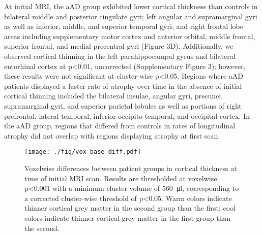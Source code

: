 \documentclass[]{article}
\begin{document}
At initial MRI, the aAD group exhibited lower cortical thickness than
controls in bilateral middle and posterior cingulate gyri; left angular
and supramarginal gyri as well as inferior, middle, and superior
temporal gyri; and right frontal lobe areas including supplementary
motor cortex and anterior orbital, middle frontal, superior frontal, and
medial precentral gyri (Figure 3D). Additionally, we observed cortical
thinning in the left parahippocampal gyrus and bilateral entorhinal
cortex at p\textless{}0.01, uncorrected (Supplementary Figure 3);
however, these results were not significant at cluster-wise
p\textless{}0.05. Regions where aAD patients displayed a faster rate of
atrophy over time in the absence of initial cortical thinning included
the bilateral insulae, angular gyri, precunei, supramarginal gyri, and
superior parietal lobules as well as portions of right prefrontal,
lateral temporal, inferior occipito-temporal, and occipital cortex. In
the aAD group, regions that differed from controls in rates of
longitudinal atrophy did not overlap with regions displaying atrophy at
first scan.

\begin{figure}[]

{\centering \texttt{[image: ./fig/vox\_base\_diff.pdf]} 

}

\caption[GM mean differences]{Voxelwise differences between patient groups in cortical thickness at time of initial MRI scan. Results are thresholded at voxelwise p<0.001 with a minimum cluster volume of \SI{560}{\micro\litre}, corresponding to a corrected cluster-wise threshold of p<0.05. Warm colors indicate thinner cortical grey matter in the second group than the first; cool colors indicate thinner cortical grey matter in the first group than the second. \label{gm_mean_diff}}

\end{figure}
\end{document}
